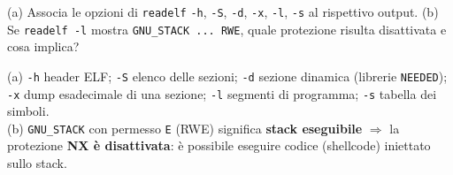 \question[5]
(a) Associa le opzioni di \lstinline|readelf| \lstinline|-h|, \lstinline|-S|, \lstinline|-d|, \lstinline|-x|, \lstinline|-l|, \lstinline|-s| al rispettivo output.
(b) Se \lstinline|readelf -l| mostra \lstinline|GNU_STACK ... RWE|, quale protezione risulta disattivata e cosa implica?
\begin{solution}
(a) \lstinline|-h| header ELF; \lstinline|-S| elenco delle sezioni; \lstinline|-d| sezione dinamica (librerie \lstinline|NEEDED|); \lstinline|-x| dump esadecimale di una sezione; \lstinline|-l| segmenti di programma; \lstinline|-s| tabella dei simboli.\\
(b) \lstinline|GNU_STACK| con permesso \lstinline|E| (RWE) significa \textbf{stack eseguibile} $\Rightarrow$ la protezione \textbf{NX è disattivata}: è possibile eseguire codice (shellcode) iniettato sullo stack.
\end{solution}
